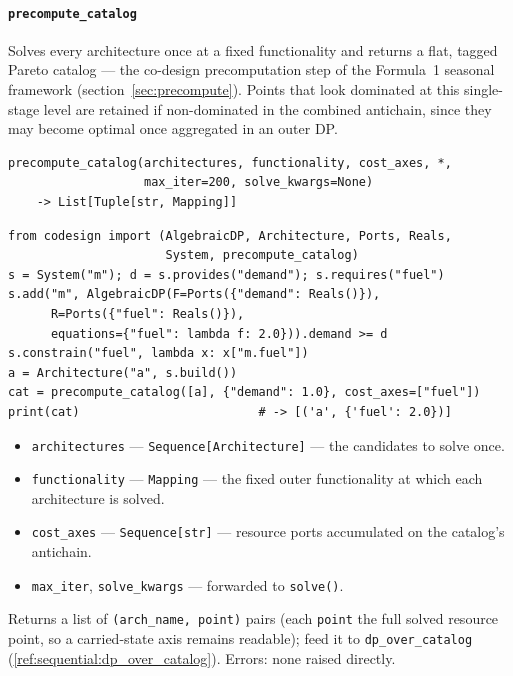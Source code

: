 \documentclass[11pt,a4paper]{article}
\begin{document}
\paragraph{\texttt{precompute\_catalog}}\label{ref:sequential:precompute_catalog}
Solves every architecture once at a fixed functionality and returns a flat,
tagged Pareto catalog --- the co-design precomputation step of the Formula~1
seasonal framework (section~\ref{sec:precompute}). Points that look dominated
at this single-stage level are retained if non-dominated in the combined
antichain, since they may become optimal once aggregated in an outer DP.
\begin{lstlisting}
precompute_catalog(architectures, functionality, cost_axes, *,
                   max_iter=200, solve_kwargs=None)
    -> List[Tuple[str, Mapping]]
\end{lstlisting}
\begin{lstlisting}
from codesign import (AlgebraicDP, Architecture, Ports, Reals,
                      System, precompute_catalog)
s = System("m"); d = s.provides("demand"); s.requires("fuel")
s.add("m", AlgebraicDP(F=Ports({"demand": Reals()}),
      R=Ports({"fuel": Reals()}),
      equations={"fuel": lambda f: 2.0})).demand >= d
s.constrain("fuel", lambda x: x["m.fuel"])
a = Architecture("a", s.build())
cat = precompute_catalog([a], {"demand": 1.0}, cost_axes=["fuel"])
print(cat)                         # -> [('a', {'fuel': 2.0})]
\end{lstlisting}
\begin{itemize}[nosep]
  \item \texttt{architectures} --- \texttt{Sequence[Architecture]} --- the
    candidates to solve once.
  \item \texttt{functionality} --- \texttt{Mapping} --- the fixed outer
    functionality at which each architecture is solved.
  \item \texttt{cost\_axes} --- \texttt{Sequence[str]} --- resource ports
    accumulated on the catalog's antichain.
  \item \texttt{max\_iter}, \texttt{solve\_kwargs} --- forwarded to
    \texttt{solve()}.
\end{itemize}
Returns a list of \texttt{(arch\_name, point)} pairs (each \texttt{point} the
full solved resource point, so a carried-state axis remains readable);
feed it to \texttt{dp\_over\_catalog} (\ref{ref:sequential:dp_over_catalog}).
Errors: none raised directly.
\end{document}
